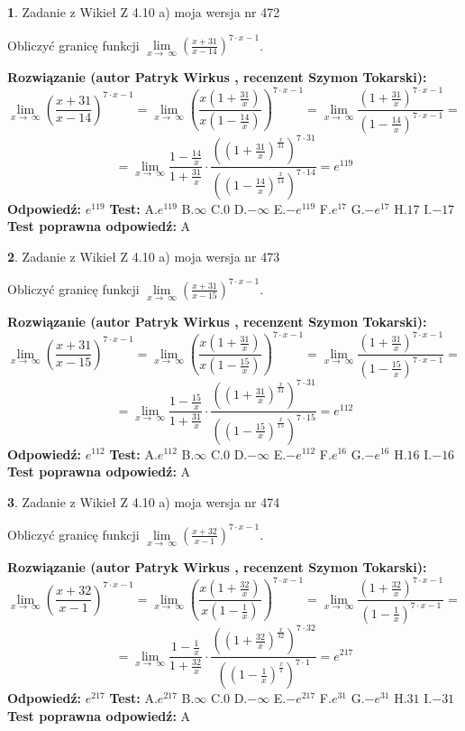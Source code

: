\documentclass[12pt, a4paper]{article}
\theoremstyle{definition} %
\newtheorem{zad}{}
\newcommand{\zadStart}[1]{\begin{zad}#1\newline}
\newcommand{\zadStop}{\end{zad}}
\newcommand{\rozwStart}[2]{\noindent \textbf{Rozwiązanie (autor #1 , recenzent #2): }\newline}
\newcommand{\rozwStop}{\newline}
\newcommand{\odpStart}{\noindent \textbf{Odpowiedź:}\newline}
\newcommand{\odpStop}{\newline}
\newcommand{\testStart}{\noindent \textbf{Test:}\newline}
\newcommand{\testStop}{\newline}
\newcommand{\kluczStart}{\noindent \textbf{Test poprawna odpowiedź:}\newline}
\newcommand{\kluczStop}{\newline}
\begin{document}
\zadStart{Zadanie z Wikieł Z 4.10 a) moja wersja nr 472}

Obliczyć granicę funkcji  $\lim\limits_{x\to\ \infty}(\frac{x+31}{x-14})^{7\cdot x-1}$.
\zadStop
\rozwStart{Patryk Wirkus}{Szymon Tokarski}
$$\lim\limits_{x\to\ \infty}(\frac{x+31}{x-14})^{7\cdot x-1} = \lim\limits_{x\to\ \infty}(\frac{x(1+\frac{31}{x})}{x(1-\frac{14}{x})})^{7\cdot x-1}=\lim\limits_{x\to\ \infty}\frac{(1+\frac{31}{x})^{7\cdot x-1}}{(1-\frac{14}{x})^{7\cdot x-1}}=$$
$$=\lim\limits_{x\to\ \infty}\frac{1-\frac{14}{x}}{1+\frac{31}{x}}\cdot\frac{((1+\frac{31}{x})^{\frac{x}{31}})^{7\cdot31}}{((1-\frac{14}{x})^{\frac{x}{14}})^{7\cdot14}}=e^{119}$$
\rozwStop
\odpStart
$e^{119}$
\odpStop
\testStart
A.$e^{119}$ B.$\infty$ C.$0$ D.$-\infty$ E.$-e^{119}$
F.$e^{17}$ G.$-e^{17}$
H.$17$
I.$-17$
\testStop
\kluczStart
A
\kluczStop



\zadStart{Zadanie z Wikieł Z 4.10 a) moja wersja nr 473}

Obliczyć granicę funkcji  $\lim\limits_{x\to\ \infty}(\frac{x+31}{x-15})^{7\cdot x-1}$.
\zadStop
\rozwStart{Patryk Wirkus}{Szymon Tokarski}
$$\lim\limits_{x\to\ \infty}(\frac{x+31}{x-15})^{7\cdot x-1} = \lim\limits_{x\to\ \infty}(\frac{x(1+\frac{31}{x})}{x(1-\frac{15}{x})})^{7\cdot x-1}=\lim\limits_{x\to\ \infty}\frac{(1+\frac{31}{x})^{7\cdot x-1}}{(1-\frac{15}{x})^{7\cdot x-1}}=$$
$$=\lim\limits_{x\to\ \infty}\frac{1-\frac{15}{x}}{1+\frac{31}{x}}\cdot\frac{((1+\frac{31}{x})^{\frac{x}{31}})^{7\cdot31}}{((1-\frac{15}{x})^{\frac{x}{15}})^{7\cdot15}}=e^{112}$$
\rozwStop
\odpStart
$e^{112}$
\odpStop
\testStart
A.$e^{112}$ B.$\infty$ C.$0$ D.$-\infty$ E.$-e^{112}$
F.$e^{16}$ G.$-e^{16}$
H.$16$
I.$-16$
\testStop
\kluczStart
A
\kluczStop



\zadStart{Zadanie z Wikieł Z 4.10 a) moja wersja nr 474}

Obliczyć granicę funkcji  $\lim\limits_{x\to\ \infty}(\frac{x+32}{x-1})^{7\cdot x-1}$.
\zadStop
\rozwStart{Patryk Wirkus}{Szymon Tokarski}
$$\lim\limits_{x\to\ \infty}(\frac{x+32}{x-1})^{7\cdot x-1} = \lim\limits_{x\to\ \infty}(\frac{x(1+\frac{32}{x})}{x(1-\frac{1}{x})})^{7\cdot x-1}=\lim\limits_{x\to\ \infty}\frac{(1+\frac{32}{x})^{7\cdot x-1}}{(1-\frac{1}{x})^{7\cdot x-1}}=$$
$$=\lim\limits_{x\to\ \infty}\frac{1-\frac{1}{x}}{1+\frac{32}{x}}\cdot\frac{((1+\frac{32}{x})^{\frac{x}{32}})^{7\cdot32}}{((1-\frac{1}{x})^{\frac{x}{1}})^{7\cdot1}}=e^{217}$$
\rozwStop
\odpStart
$e^{217}$
\odpStop
\testStart
A.$e^{217}$ B.$\infty$ C.$0$ D.$-\infty$ E.$-e^{217}$
F.$e^{31}$ G.$-e^{31}$
H.$31$
I.$-31$
\testStop
\kluczStart
A
\kluczStop
\end{document}
